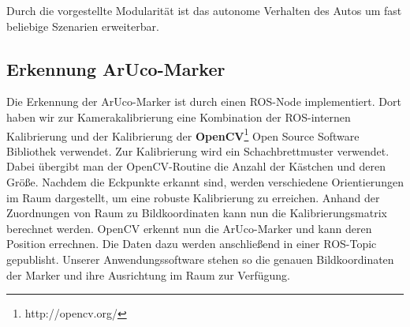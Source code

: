 Durch die vorgestellte Modularität ist das autonome Verhalten des Autos um fast beliebige Szenarien erweiterbar. 

\subsection{Erkennung ArUco-Marker}
Die Erkennung der ArUco-Marker ist durch einen ROS-Node implementiert. Dort haben wir zur Kamerakalibrierung eine Kombination der ROS-internen Kalibrierung und der Kalibrierung der  \textbf{OpenCV}\footnote[1]{http://opencv.org/} Open Source Software Bibliothek verwendet. Zur Kalibrierung wird ein Schachbrettmuster verwendet. Dabei übergibt man der OpenCV-Routine die Anzahl der Kästchen und deren Größe. Nachdem die Eckpunkte erkannt sind, werden verschiedene Orientierungen im Raum dargestellt, um eine robuste Kalibrierung zu erreichen. Anhand der Zuordnungen von Raum zu Bildkoordinaten kann nun die Kalibrierungsmatrix berechnet werden. 
OpenCV erkennt nun die ArUco-Marker und kann deren Position errechnen. Die Daten dazu werden anschließend in einer ROS-Topic gepublisht. Unserer Anwendungssoftware stehen so die genauen Bildkoordinaten der Marker und ihre Ausrichtung im Raum zur Verfügung.  

